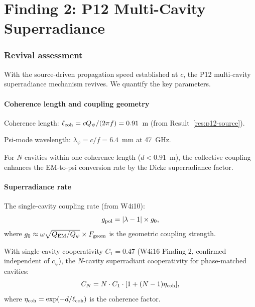 \documentclass[11pt]{article}
\begin{document}
\part{Finding 2: P12 Multi-Cavity Superradiance}
\label{part:p12}

\section{Revival assessment}

With the source-driven propagation speed established at $c$, the
P12 multi-cavity superradiance mechanism revives. We quantify the
key parameters.

\subsection{Coherence length and coupling geometry}

Coherence length: $\ell_{\rm coh} = c Q_\psi/(2\pi f) = 0.91$~m
(from Result~\ref{res:p12-source}).

Psi-mode wavelength: $\lambda_\psi = c/f = 6.4$~mm at 47~GHz.

For $N$ cavities within one coherence length ($d < 0.91$~m), the
collective coupling enhances the EM-to-psi conversion rate by the
Dicke superradiance factor.

\subsection{Superradiance rate}

The single-cavity coupling rate (from W4i10):
\begin{equation}
g_{\rm pol} = |\lambda - 1| \times g_0,
\end{equation}
where $g_0 \approx \omega\sqrt{Q_{\rm EM}/Q_\psi} \times F_{\rm geom}$
is the geometric coupling strength.

With single-cavity cooperativity $C_1 = 0.47$ (W4i16 Finding 2,
confirmed independent of $c_\psi$), the $N$-cavity superradiant
cooperativity for phase-matched cavities:
\begin{equation}
C_N = N \cdot C_1 \cdot [1 + (N-1)\eta_{\rm coh}],
\end{equation}
where $\eta_{\rm coh} = \exp(-d/\ell_{\rm coh})$ is the coherence factor.
\end{document}
